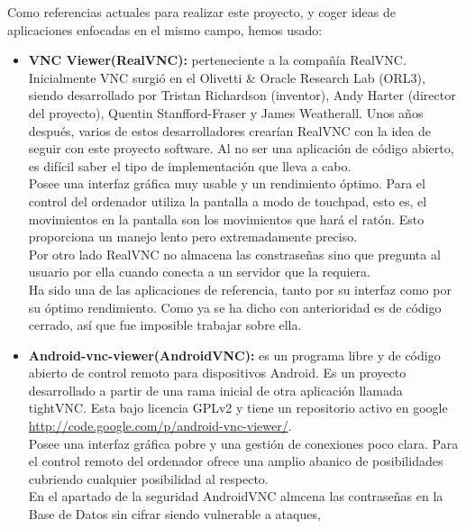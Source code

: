 Como referencias actuales para realizar este proyecto, y coger ideas de aplicaciones enfocadas en el mismo campo, hemos usado:
\begin{itemize}
\item \textbf{VNC Viewer(RealVNC)\cite{wiki:realvnc}:} perteneciente a la compañía RealVNC. Inicialmente VNC surgió en el Olivetti \& Oracle Research Lab (ORL3), siendo desarrollado por Tristan Richardson (inventor), Andy Harter (director del proyecto), Quentin Stanfford-Fraser y James Weatherall. Unos años después, varios de estos desarrolladores crearían RealVNC con la idea de seguir con este proyecto software. Al no ser una aplicación de código abierto, es difícil saber el tipo de implementación que lleva a cabo.\\

Posee una interfaz gráfica muy usable y un rendimiento óptimo. Para el control del ordenador utiliza la pantalla a modo de touchpad, esto es, el movimientos en la pantalla son los movimientos que hará el ratón. Esto proporciona un manejo lento pero extremadamente preciso.\\

Por otro lado RealVNC no almacena las constraseñas sino que pregunta al usuario por ella cuando conecta a un servidor que la requiera.\\

Ha sido una de las aplicaciones de referencia, tanto por su interfaz como por su óptimo rendimiento. Como ya se ha dicho con anterioridad es de código cerrado, así que fue imposible trabajar sobre ella.

\item \textbf{Android-vnc-viewer(AndroidVNC)\cite{androidvnc:androidvnc}:} es un programa libre y de código abierto de control remoto para dispositivos Android. Es un proyecto desarrollado a partir de una rama inicial de otra aplicación llamada tightVNC. Esta bajo licencia GPLv2 y tiene un repositorio activo en google \url{http://code.google.com/p/android-vnc-viewer/}.\\

Posee una interfaz gráfica pobre y una gestión de conexiones poco clara. Para el control remoto del ordenador ofrece una amplio abanico de posibilidades cubriendo cualquier posibilidad al respecto.\\

En el apartado de la seguridad AndroidVNC almcena las contraseñas en la Base de Datos sin cifrar siendo vulnerable a ataques,\\


\end{itemize}
